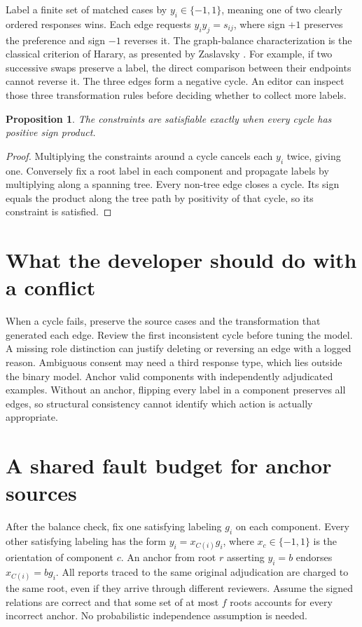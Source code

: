 \documentclass[11pt]{article}
\newtheorem{proposition}{Proposition}
\begin{document}
Label a finite set of matched cases by $y_i\in\{-1,1\}$,
meaning one of two clearly ordered responses wins. Each edge
requests $y_i y_j=s_{ij}$, where sign $+1$ preserves the preference
and sign $-1$ reverses it. The graph-balance characterization is the classical criterion of
Harary, as presented by Zaslavsky \cite{zaslavsky}. For example,
if two successive swaps preserve a label, the direct comparison
between their endpoints cannot reverse it. The three edges form a
negative cycle. An editor can inspect those three transformation
rules before deciding whether to collect more labels.

\begin{proposition}
The constraints are satisfiable exactly when every cycle has
positive sign product.
\end{proposition}
\begin{proof}
Multiplying the constraints around a cycle cancels each $y_i$
twice, giving one. Conversely fix a root label in each component
and propagate labels by multiplying along a spanning tree.
Every non-tree edge closes a cycle. Its sign equals the product
along the tree path by positivity of that cycle, so its constraint
is satisfied.
\end{proof}

\section{What the developer should do with a conflict}
When a cycle fails, preserve the source cases and the transformation
that generated each edge. Review the first inconsistent cycle before
tuning the model. A missing role distinction can justify deleting
or reversing an edge with a logged reason. Ambiguous consent may
need a third response type, which lies outside the binary model.
Anchor valid components with independently adjudicated examples.
Without an anchor, flipping every label in a component preserves
all edges, so structural consistency cannot identify which action
is actually appropriate.

\section{A shared fault budget for anchor sources}
After the balance check, fix one satisfying labeling $g_i$ on
each component. Every other satisfying labeling has the form
$y_i=x_{C(i)}g_i$, where $x_c\in\{-1,1\}$ is the orientation of
component $c$. An anchor from root $r$ asserting $y_i=b$
endorses $x_{C(i)}=bg_i$. All reports traced to the same original
adjudication are charged to the same root, even if they arrive
through different reviewers. Assume the signed relations are
correct and that some set of at most $f$ roots accounts for
every incorrect anchor. No probabilistic independence assumption
is needed.
\end{document}
